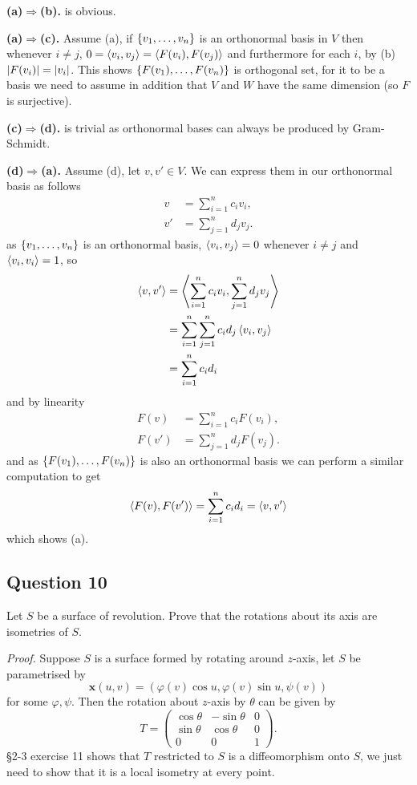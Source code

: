 \documentclass[12pt]{article}
\begin{document}
\textbf{(a)$\Rightarrow$(b).} is obvious.

\textbf{(a)$\Rightarrow$(c).} Assume (a), if \(\left\{ v_1,\dots,v_n \right\}\) is an orthonormal basis in \(V\) then whenever \(i\ne j\),
\(0 = \left\langle v_i,v_j \right\rangle = \left\langle F(v_i),F(v_j) \right\rangle\) and furthermore for each \(i\), by (b) \(\left\lvert F(v_i) \right\rvert = \left\lvert v_i \right\rvert\).
This shows \(\left\{ F(v_1),\dots,F(v_n) \right\}\) is orthogonal set, for it to be a basis we need to assume in addition that \(V\) and \(W\) have the same dimension (so \(F\) is surjective).

\textbf{(c)$\Rightarrow$(d).} is trivial as orthonormal bases can always be produced by Gram-Schmidt.

\textbf{(d)$\Rightarrow$(a).} Assume (d), let \(v,v'\in V\).
We can express them in our orthonormal basis as follows
\begin{align*}
    v &= \sum_{i=1}^n c_i v_i,\\
    v' &= \sum_{j=1}^n d_j v_j.
\end{align*}
as \(\left\{ v_1,\dots,v_n \right\}\) is an orthonormal basis, \(\left\langle v_i,v_j \right\rangle = 0\) whenever \(i\ne j\) and \(\left\langle v_i,v_i \right\rangle = 1\), so
\begin{align*}
    \left\langle v,v' \right\rangle &= \left\langle  \sum_{i=1}^n c_i v_i, \sum_{j=1}^n d_j v_j  \right\rangle \\
                 &= \sum_{i=1}^n \sum_{j=1}^n c_i d_j \left\langle v_i,v_j \right\rangle \\
                 &= \sum_{i=1}^n c_i d_i
\end{align*}
and by linearity
\begin{align*}
    F(v) &= \sum_{i=1}^n c_i F(v_i),\\
    F(v') &= \sum_{j=1}^n d_j F(v_j).
\end{align*}
and as \(\left\{ F(v_1),\dots,F(v_n) \right\}\) is also an orthonormal basis we can perform a similar computation to get
\[ \left\langle F(v),F(v') \right\rangle = \sum_{i=1}^n c_i d_i = \left\langle v,v' \right\rangle  \]
which shows (a).


\subsection*{Question 10}

Let \(S\) be a surface of revolution. Prove that the rotations about its axis are isometries of \(S\).

\emph{Proof.}
Suppose \(S\) is a surface formed by rotating around \(z\)-axis, let \(S\) be parametrised by
\[ \mathbf{x}(u,v) = (\varphi(v)\cos u, \varphi(v)\sin u, \psi(v)) \]
for some \(\varphi, \psi\).
Then the rotation about \(z\)-axis by \(\theta\) can be given by
\[ T = \begin{pmatrix}
    \cos\theta & -\sin\theta & 0 \\
    \sin\theta & \cos\theta & 0 \\
    0 & 0 & 1
\end{pmatrix}. \]
§2-3 exercise 11 shows that \(T\) restricted to \(S\) is a diffeomorphism onto \(S\),
we just need to show that it is a local isometry at every point.
\end{document}
